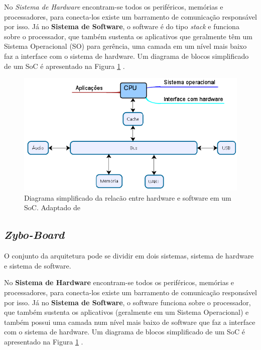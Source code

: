 No \textit{Sistema de Hardware} encontram-se todos os periféricos, memórias e processadores, para conecta-los existe um barramento de comunicação responsável por isso. Já no \textbf{Sistema de Software}, o software é do tipo \textit{stack} e funciona sobre o
processador, que também sustenta os aplicativos que geralmente têm um
Sistema Operacional (SO) para gerência, uma camada em um nível mais baixo
faz a interface com o sistema de hardware. Um diagrama de blocos simplificado de um SoC é apresentado na Figura \ref{diagram SoC} \cite{zynqBook}.
\pagebreak

\begin{figure}[h]
	\centering
	\includegraphics[keepaspectratio=true,scale=0.5]{figuras/diaagrama-soc.png}
	\caption{Diagrama simplificado da relacão entre hardware e software em um SoC. Adaptado de \cite{cao2017post}}
	\label{diagram SoC}
\end{figure}


\subsection{\textit{Zybo-Board}}
O conjunto da arquitetura pode se dividir em dois sistemas, sistema de hardware  e sistema de software. 


No \textbf{Sistema de Hardware} encontram-se todos os periféricos, memórias e processadores, para conecta-los existe um barramento de comunicação responsável por isso. Já no \textbf{Sistema de Software}, o software funciona sobre o processador, que também sustenta os aplicativos (geralmente em um Sistema Operacional)  e também possui uma camada num nível mais baixo de software que 
faz a interface com o sistema de hardware. Um diagrama de blocos simplificado de um SoC é apresentado na Figura \ref{diagram SoC} \cite{zynqBook}.
\pagebreak

